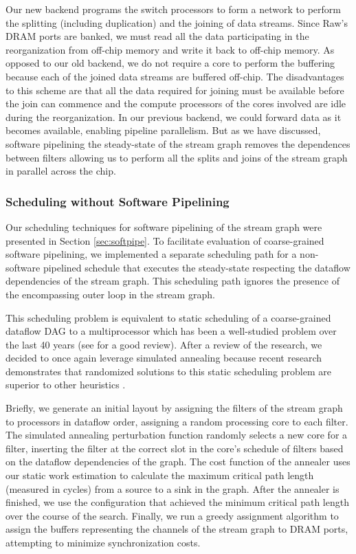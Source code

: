 Our new backend programs the switch processors to form a network to
perform the splitting (including duplication) and the joining of data
streams.  Since Raw's DRAM ports are banked, we must read all the data
participating in the reorganization from off-chip memory and write it
back to off-chip memory.  As opposed to our old backend, we do not
require a core to perform the buffering because each of the joined
data streams are buffered off-chip.  The disadvantages to this scheme
are that all the data required for joining must be available before
the join can commence and the compute processors of the cores involved
are idle during the reorganization.  In our previous backend, we could
forward data as it becomes available, enabling pipeline parallelism.
But as we have discussed, software pipelining the steady-state of the
stream graph removes the dependences between filters allowing us to
perform all the splits and joins of the stream graph in parallel
across the chip.


\subsubsection{Scheduling without Software Pipelining}
Our scheduling techniques for software pipelining of the stream graph
were presented in Section \ref{sec:softpipe}.  To facilitate
evaluation of coarse-grained software pipelining, we implemented a
separate scheduling path for a non-software pipelined schedule that
executes the steady-state respecting the dataflow dependencies of the
stream graph.  This scheduling path ignores the presence of the
encompassing outer loop in the stream graph.    

This scheduling problem is equivalent to static scheduling of a
coarse-grained dataflow DAG to a multiprocessor which has been a
well-studied problem over the last 40 years (see \cite{DAGSched} for a
good review).  After a review of the research, we decided to once
again leverage simulated annealing because recent research
demonstrates that randomized solutions to this static scheduling
problem are superior to other heuristics \cite{kwok99fastest}. 

Briefly, we generate an initial layout by assigning the filters of the
stream graph to processors in dataflow order, assigning a random
processing core to each filter. The simulated annealing perturbation
function randomly selects a new core for a filter, inserting the
filter at the correct slot in the core's schedule of filters based on
the dataflow dependencies of the graph.  The cost function of the
annealer uses our static work estimation to calculate the maximum
critical path length (measured in cycles) from a source to a sink in
the graph.  After the annealer is finished, we use the configuration
that achieved the minimum critical path length over the course of the
search.  Finally, we run a greedy assignment algorithm to assign the
buffers representing the channels of the stream graph to DRAM ports,
attempting to minimize synchronization costs.

